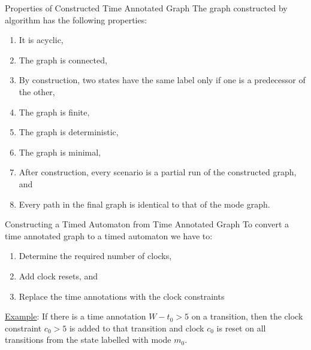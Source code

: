 \documentclass[10pt]{beamer}
\theoremstyle{plain}
\theoremstyle{definition}
\begin{document}
\begin{frame}{Properties of Constructed Time Annotated Graph}
The graph constructed by algorithm has the following properties:
	\begin{enumerate}
		\item
		It is acyclic,%
		\item
		The graph is connected,%
		\item\label{p3}
		By construction, two states have the same label only if one is a predecessor of the other, %
		\item\label{p4} The graph is finite,
		\item
		The graph is deterministic,%
		\item
		The graph is minimal, %
		\item
		After construction, every scenario is a partial run of the constructed graph, and
		\item
		Every path in the final graph is identical to that of the mode graph. %
	\end{enumerate}

\end{frame}


\begin{frame}{Constructing a Timed Automaton from Time Annotated Graph}
	To convert a time annotated graph to a timed automaton we have to:
	\begin{enumerate}	
		\item Determine the required number of clocks,
		\item Add clock resets, and
		\item Replace the time annotations with the clock constraints
	\end{enumerate}
	\underline{Example}: If there is a time annotation $W-t_0 > 5$ on a transition, then the clock constraint $c_0 > 5$ is added to that transition and clock $c_0$ is reset on all transitions from the state labelled with mode $m_0$.
\end{frame}
\end{document}
